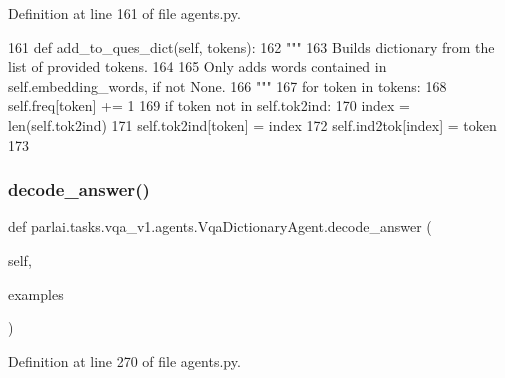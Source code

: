 Definition at line 161 of file agents.\+py.


\begin{DoxyCode}
161     \textcolor{keyword}{def }add\_to\_ques\_dict(self, tokens):
162         \textcolor{stringliteral}{"""}
163 \textcolor{stringliteral}{        Builds dictionary from the list of provided tokens.}
164 \textcolor{stringliteral}{}
165 \textcolor{stringliteral}{        Only adds words contained in self.embedding\_words, if not None.}
166 \textcolor{stringliteral}{        """}
167         \textcolor{keywordflow}{for} token \textcolor{keywordflow}{in} tokens:
168             self.freq[token] += 1
169             \textcolor{keywordflow}{if} token \textcolor{keywordflow}{not} \textcolor{keywordflow}{in} self.tok2ind:
170                 index = len(self.tok2ind)
171                 self.tok2ind[token] = index
172                 self.ind2tok[index] = token
173 
\end{DoxyCode}
\mbox{\label{classparlai_1_1tasks_1_1vqa__v1_1_1agents_1_1VqaDictionaryAgent_a9e857a32d09fd4b4e09c80e11a1f947b}} 
\subsubsection{\texorpdfstring{decode\+\_\+answer()}{decode\_answer()}}
{\footnotesize\ttfamily def parlai.\+tasks.\+vqa\+\_\+v1.\+agents.\+Vqa\+Dictionary\+Agent.\+decode\+\_\+answer (\begin{DoxyParamCaption}\item[{}]{self,  }\item[{}]{examples }\end{DoxyParamCaption})}



Definition at line 270 of file agents.\+py.


